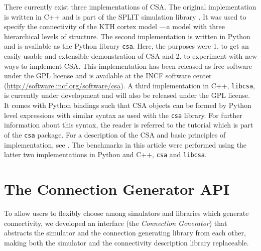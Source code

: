 \documentclass{frontiersSCNS} %
\begin{document}
There currently exist three implementations of CSA.  The original
implementation is written in C++ and is part of the SPLIT simulation
library \citep{djurfeldt05}.  It was used to specify the connectivity
of the KTH cortex model \citep{djurfeldt08}---a model with three
hierarchical levels of structure.  The second implementation is
written in Python and is available as the Python library \verb|csa|.
Here, the purposes were 1. to get an easily usable and extensible
demonstration of CSA and 2. to experiment with new ways to implement
CSA. This implementation has been released as free software under the
GPL license and is available at the INCF software center
(\url{http://software.incf.org/software/csa}). A third implementation
in C++, \verb|libcsa|, is currently under development and will also be
released under the GPL license. It comes with Python bindings such
that CSA objects can be formed by Python level expressions with
similar syntax as used with the \verb|csa| library. For further
information about this syntax, the reader is referred to the tutorial
which is part of the \verb|csa| package. For a description of the CSA
and basic principles of implementation, see \citet{djurfeldt10}.  The
benchmarks in this article were performed using the latter two
implementations in Python and C++, \verb|csa| and \verb|libcsa|.




\section{The Connection Generator API}

To allow users to flexibly choose among simulators and libraries
which generate connectivity, we developed an interface (the
\emph{Connection Generator}) that abstracts the simulator and the
connection generating library from each other, making both the
simulator and the connectivity description library replaceable.
\end{document}
